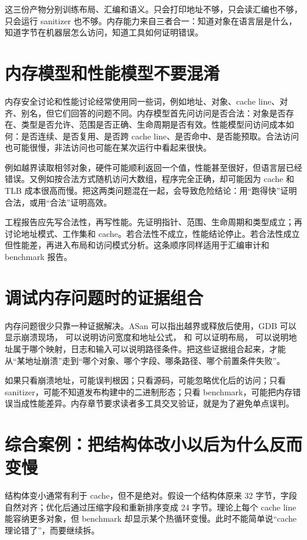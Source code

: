这三份产物分别训练布局、汇编和语义。只会打印地址不够，只会读汇编也不够，只会运行 sanitizer 也不够。内存能力来自三者合一：知道对象在语言层是什么，知道字节在机器层怎么访问，知道工具如何证明错误。

\section{内存模型和性能模型不要混淆}

内存安全讨论和性能讨论经常使用同一些词，例如地址、对象、cache line、对齐、别名，但它们回答的问题不同。内存模型首先问访问是否合法：对象是否存在、类型是否允许、范围是否正确、生命周期是否有效。性能模型问访问成本如何：是否连续、是否复用、是否跨 cache line、是否命中、是否能预取。合法访问也可能很慢，非法访问也可能在某次运行中看起来很快。

例如越界读取相邻对象，硬件可能顺利返回一个值，性能甚至很好，但语言层已经错误。又例如按合法方式随机访问大数组，程序完全正确，却可能因为 cache 和 TLB 成本很高而慢。把这两类问题混在一起，会导致危险结论：用“跑得快”证明合法，或用“合法”证明高效。

工程报告应先写合法性，再写性能。先证明指针、范围、生命周期和类型成立；再讨论地址模式、工作集和 cache。若合法性不成立，性能结论停止。若合法性成立但性能差，再进入布局和访问模式分析。这条顺序同样适用于汇编审计和 benchmark 报告。

\section{调试内存问题时的证据组合}

内存问题很少只靠一种证据解决。ASan 可以指出越界或释放后使用，GDB 可以显示崩溃现场， 可以说明访问宽度和地址公式， 和  可以证明布局， 可以说明地址属于哪个映射，日志和输入可以说明路径条件。把这些证据组合起来，才能从“某地址崩溃”走到“哪个对象、哪个字段、哪条路径、哪个前置条件失败”。

如果只看崩溃地址，可能误判根因；只看源码，可能忽略优化后的访问；只看 sanitizer，可能不知道发布构建中的二进制形态；只看 benchmark，可能把内存错误当成性能差异。内存章节要求读者多工具交叉验证，就是为了避免单点误判。

\section{综合案例：把结构体改小以后为什么反而变慢}

结构体变小通常有利于 cache，但不是绝对。假设一个结构体原来 32 字节，字段自然对齐；优化后通过压缩字段和重新排序变成 24 字节。理论上每个 cache line 能容纳更多对象，但 benchmark 却显示某个热循环变慢。此时不能简单说“cache 理论错了”，而要继续拆。

